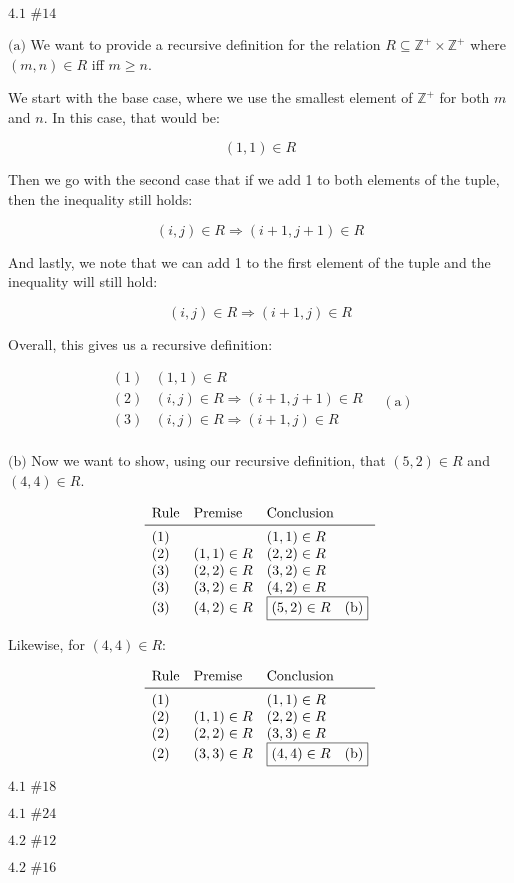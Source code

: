 \documentclass{article}
\newcommand{\problem}[2]{$\boxed{\text{#1 \##2}}$}
\newcommand{\subproblem}[1]{$\boxed{\text{(#1)}}$}
\newcommand{\subsolution}[2]{\boxed{#2\quad(\text{#1})}}
\begin{document}
%
\problem{4.1}{14}

%
\subproblem{a} We want to provide a recursive definition for the
relation $R\subseteq{}\mathbb{Z}^+\times\mathbb{Z}^+$ where
$(m,n)\in{}R$ iff $m\ge{}n$.

We start with the base case, where we use the smallest element of
$\mathbb{Z}^+$ for both $m$ and $n$. In this case, that would be:

\[
(1,1)\in R
\]

Then we go with the second case that if we add 1 to both elements of
the tuple, then the inequality still holds:

\[
(i,j)\in R\Rightarrow (i+1,j+1)\in R
\]

And lastly, we note that we can add 1 to the first element of the
tuple and the inequality will still hold:

\[
(i,j)\in R\Rightarrow (i+1,j)\in R
\]

Overall, this gives us a recursive definition:

\[
\subsolution{a}{
\begin{array}{ll}
(1) & (1,1)\in R \\
(2) & (i,j)\in R\Rightarrow (i+1,j+1)\in R \\
(3) & (i,j)\in R\Rightarrow (i+1,j)\in R \\
\end{array}
}
\]

%
\subproblem{b} Now we want to show, using our recursive definition,
that $(5,2)\in{}R$ and $(4,4)\in{}R$.

\[
\begin{array}{lll}
\text{Rule} & \text{Premise} & \text{Conclusion} \\
\midrule
(1) & & (1,1)\in R \\
(2) & (1,1)\in R & (2,2)\in R \\
(3) & (2,2)\in R & (3,2)\in R \\
(3) & (3,2)\in R & (4,2)\in R \\
(3) & (4,2)\in R & \subsolution{b}{(5,2)\in R} \\
\end{array}
\]

Likewise, for $(4,4)\in{}R$:

\[
\begin{array}{lll}
\text{Rule} & \text{Premise} & \text{Conclusion} \\
\midrule
(1) & & (1,1)\in R \\
(2) & (1,1)\in R & (2,2)\in R \\
(2) & (2,2)\in R & (3,3)\in R \\
(2) & (3,3)\in R & \subsolution{b}{(4,4)\in R} \\
\end{array}
\]

%
\problem{4.1}{18}

%
\problem{4.1}{24}

%
\problem{4.2}{12}

%
\problem{4.2}{16}
\end{document}
